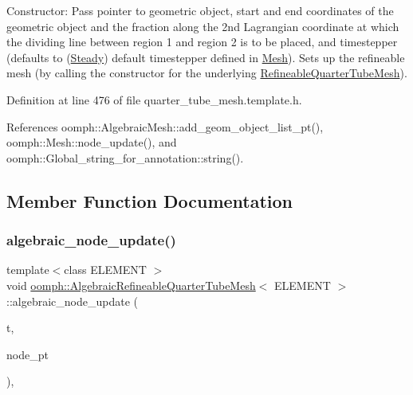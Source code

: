 Constructor\+: Pass pointer to geometric object, start and end coordinates of the geometric object and the fraction along the 2nd Lagrangian coordinate at which the dividing line between region 1 and region 2 is to be placed, and timestepper (defaults to (\hyperlink{classoomph_1_1Steady}{Steady}) default timestepper defined in \hyperlink{classoomph_1_1Mesh}{Mesh}). Sets up the refineable mesh (by calling the constructor for the underlying \hyperlink{classoomph_1_1RefineableQuarterTubeMesh}{Refineable\+Quarter\+Tube\+Mesh}). 



Definition at line 476 of file quarter\+\_\+tube\+\_\+mesh.\+template.\+h.



References oomph\+::\+Algebraic\+Mesh\+::add\+\_\+geom\+\_\+object\+\_\+list\+\_\+pt(), oomph\+::\+Mesh\+::node\+\_\+update(), and oomph\+::\+Global\+\_\+string\+\_\+for\+\_\+annotation\+::string().



\subsection{Member Function Documentation}
\mbox{\label{classoomph_1_1AlgebraicRefineableQuarterTubeMesh_af98a0aaff29c54ffa35f72f7dcf6b8c7}} 
\subsubsection{\texorpdfstring{algebraic\+\_\+node\+\_\+update()}{algebraic\_node\_update()}}
{\footnotesize\ttfamily template$<$class E\+L\+E\+M\+E\+NT $>$ \\
void \hyperlink{classoomph_1_1AlgebraicRefineableQuarterTubeMesh}{oomph\+::\+Algebraic\+Refineable\+Quarter\+Tube\+Mesh}$<$ E\+L\+E\+M\+E\+NT $>$\+::algebraic\+\_\+node\+\_\+update (\begin{DoxyParamCaption}\item[{const unsigned \&}]{t,  }\item[{\hyperlink{classoomph_1_1AlgebraicNode}{Algebraic\+Node} $\ast$\&}]{node\+\_\+pt }\end{DoxyParamCaption})\hspace{0.3cm}{\ttfamily [inline]}, {\ttfamily [virtual]}}




